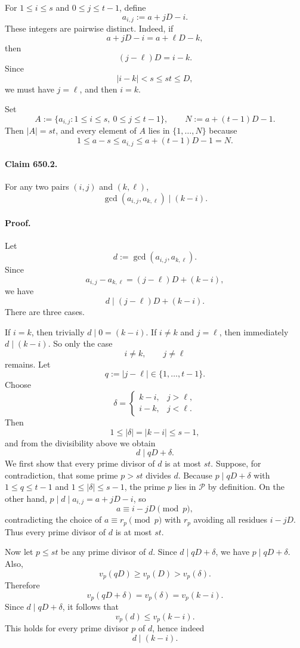 For $1\le i\le s$ and $0\le j\le t-1$, define
\[
 a_{i,j}:=a+jD-i.
\]
These integers are pairwise distinct.  Indeed, if
\[
 a+jD-i=a+\ell D-k,
\]
then
\[
 (j-\ell)D=i-k.
\]
Since
\[
 |i-k|<s\le st\le D,
\]
we must have $j=\ell$, and then $i=k$.

Set
\[
 A:=\{a_{i,j}:1\le i\le s,\ 0\le j\le t-1\},
 \qquad
 N:=a+(t-1)D-1.
\]
Then $|A|=st$, and every element of $A$ lies in $\{1,\dots,N\}$ because
\[
 1\le a-s\le a_{i,j}\le a+(t-1)D-1=N.
\]

\paragraph{Claim 650.2.}
For any two pairs $(i,j)$ and $(k,\ell)$,
\[
 \gcd(a_{i,j},a_{k,\ell})\mid (k-i).
\]

\paragraph{Proof.}
Let
\[
 d:=\gcd(a_{i,j},a_{k,\ell}).
\]
Since
\[
 a_{i,j}-a_{k,\ell}=(j-\ell)D+(k-i),
\]
we have
\[
 d\mid (j-\ell)D+(k-i).
\]
There are three cases.

If $i=k$, then trivially $d\mid 0=(k-i)$.
If $i\ne k$ and $j=\ell$, then immediately $d\mid (k-i)$.
So only the case
\[
 i\ne k,
 \qquad
 j\ne \ell
\]
remains.
Let
\[
 q:=|j-\ell|\in\{1,\dots,t-1\}.
\]
Choose
\[
 \delta=
 \begin{cases}
 k-i,& j>\ell,\\
 i-k,& j<\ell.
 \end{cases}
\]
Then
\[
 1\le |\delta|=|k-i|\le s-1,
\]
and from the divisibility above we obtain
\[
 d\mid qD+\delta.
\]
We first show that every prime divisor of $d$ is at most $st$.
Suppose, for contradiction, that some prime $p>st$ divides $d$.
Because $p\mid qD+\delta$ with $1\le q\le t-1$ and $1\le |\delta|\le s-1$, the prime $p$ lies in $\mathcal P$ by definition.
On the other hand, $p\mid d\mid a_{i,j}=a+jD-i$, so
\[
 a\equiv i-jD \pmod p,
\]
contradicting the choice of $a\equiv r_p\pmod p$ with $r_p$ avoiding all residues $i-jD$.
Thus every prime divisor of $d$ is at most $st$.

Now let $p\le st$ be any prime divisor of $d$.
Since $d\mid qD+\delta$, we have $p\mid qD+\delta$.
Also,
\[
 v_p(qD)\ge v_p(D)>v_p(\delta).
\]
Therefore
\[
 v_p(qD+\delta)=v_p(\delta)=v_p(k-i).
\]
Since $d\mid qD+\delta$, it follows that
\[
 v_p(d)\le v_p(k-i).
\]
This holds for every prime divisor $p$ of $d$, hence indeed
\[
 d\mid (k-i).
\]

